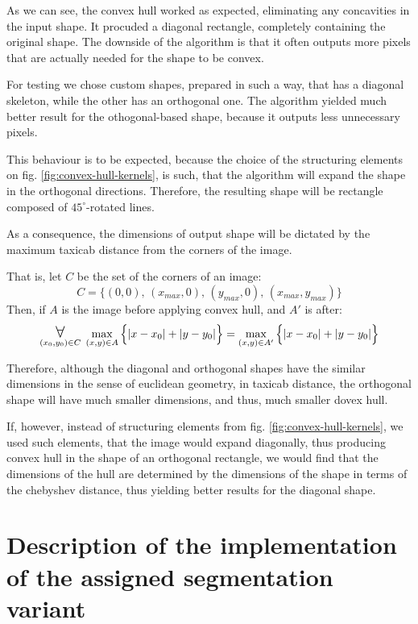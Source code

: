 \documentclass[12pt]{article}
\begin{document}
As we can see, the convex hull worked as expected, eliminating any concavities in the input shape.
It procuded a diagonal rectangle, completely containing the original shape.
The downside of the algorithm is that it often outputs more pixels that are actually needed for the shape to be convex.

For testing we chose custom shapes, prepared in such a way, that has a diagonal skeleton, while the other has an orthogonal one.
The algorithm yielded much better result for the othogonal-based shape, 
because it outputs less unnecessary pixels.

This behaviour is to be expected, because the choice of the structuring elements on fig. \ref{fig:convex-hull-kernels}, 
is such, that the algorithm will expand the shape in the orthogonal directions.
Therefore, the resulting shape will be rectangle composed of $45^\circ$-rotated lines.

As a consequence, the dimensions of output shape will be dictated by the maximum taxicab distance from the corners of the image.

That is, let $C$ be the set of the corners of an image:
\begin{equation*}
    C = \big\{ (0,0),\, (x_{max},0),\, (y_{max},0),\, (x_{max},y_{max}) \big\}
\end{equation*}
Then, if $A$ is the image before applying convex hull, and $A'$ is after:
\begin{equation*}
    \biggerforall_{(x_0,y_0) \in C} \;
    \max\limits_{(x,y) \in A}\Big\{ |x - x_0| + |y - y_0| \Big\} = \max\limits_{(x,y) \in A'} \Big\{ |x - x_0| + |y - y_0| \Big\}
\end{equation*}

Therefore, although the diagonal and orthogonal shapes have the similar dimensions in the sense of euclidean geometry,
in taxicab distance, the orthogonal shape will have much smaller dimensions, and thus, much smaller dovex hull.

If, however, instead of structuring elements from fig. \ref{fig:convex-hull-kernels}, 
we used such elements, that the image would expand diagonally, thus producing convex hull in the shape of an orthogonal rectangle,
we would find that the dimensions of the hull are determined by the dimensions of the shape in terms of the chebyshev distance,
thus yielding better results for the diagonal shape.

\section{Description of the implementation of the assigned segmentation variant}
\end{document}
